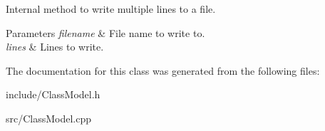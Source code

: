 Internal method to write multiple lines to a file. 


\begin{DoxyParams}{Parameters}
{\em filename} & File name to write to. \\
\hline
{\em lines} & Lines to write. \\
\hline
\end{DoxyParams}


The documentation for this class was generated from the following files\+:\begin{DoxyCompactItemize}
\item 
include/Class\+Model.\+h\item 
src/Class\+Model.\+cpp\end{DoxyCompactItemize}
